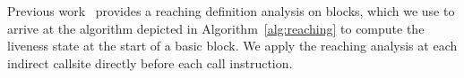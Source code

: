 

%
%

Previous work~\cite{khedker2009data} provides a reaching definition analysis on blocks, which we use to arrive at the algorithm depicted in 
Algorithm~\ref{alg:reaching} to compute the liveness state at the start of a basic block. We apply the reaching analysis at each indirect 
callsite directly before each call instruction.

